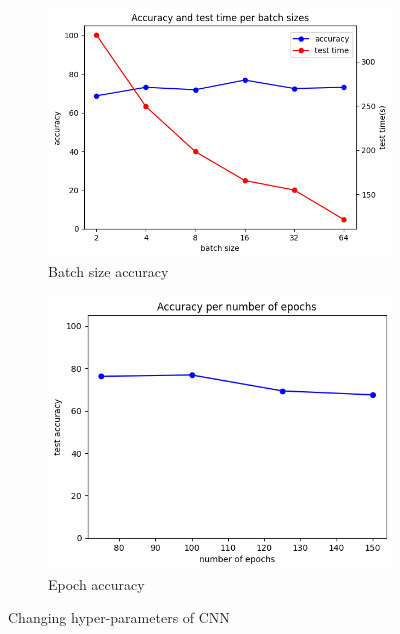 \begin{figure}
\begin{subfigure}{0.23\linewidth}
		\centering
		\includegraphics[width=\linewidth]{image/q4-7-batch.png}
		\caption{Batch size accuracy}
		\label{fig:q4-7-batch}
	\end{subfigure}
	\hfill
	\begin{subfigure}{0.23\linewidth}
		\centering
		\includegraphics[width=\linewidth]{image/q4-7-epoch.png}
		\caption{Epoch accuracy}
		\label{fig:q4-7-epoch}
	\end{subfigure}
	\caption{Changing hyper-parameters of CNN}
	\label{fig:q2}
\end{figure}

